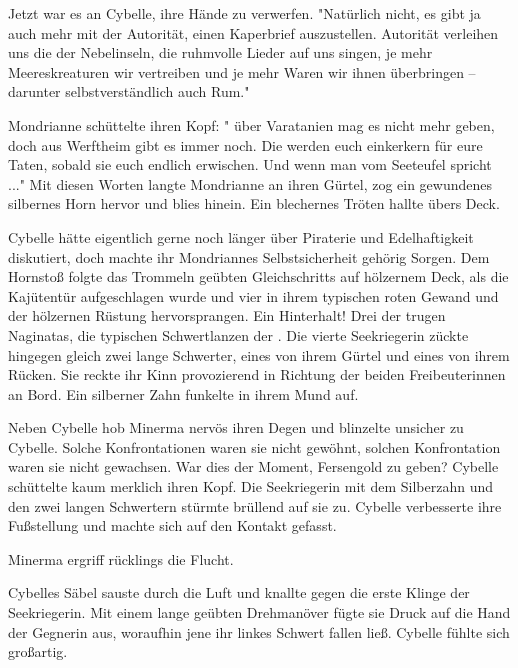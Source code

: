 Jetzt war es an Cybelle, ihre Hände zu verwerfen. "Natürlich nicht, es gibt ja auch  mehr mit der Autorität, einen Kaperbrief auszustellen. Autorität verleihen uns die  der Nebelinseln, die ruhmvolle Lieder auf uns singen, je mehr Meereskreaturen wir vertreiben und je mehr Waren wir ihnen überbringen – darunter selbstverständlich auch Rum."

Mondrianne schüttelte ihren Kopf: " über Varatanien mag es nicht mehr geben, doch  aus Werftheim gibt es immer noch. Die werden euch einkerkern für eure Taten, sobald sie euch endlich erwischen. Und wenn man vom Seeteufel spricht ..." Mit diesen Worten langte Mondrianne an ihren Gürtel, zog ein gewundenes silbernes Horn hervor und blies hinein. Ein blechernes Tröten hallte übers Deck.

Cybelle hätte eigentlich gerne noch länger über Piraterie und Edelhaftigkeit diskutiert, doch machte ihr Mondriannes Selbstsicherheit gehörig Sorgen. Dem Hornstoß folgte das Trommeln geübten Gleichschritts auf hölzernem Deck, als die Kajütentür aufgeschlagen wurde und vier  in ihrem typischen roten Gewand und der hölzernen Rüstung hervorsprangen. Ein Hinterhalt! Drei der  trugen Naginatas, die typischen Schwertlanzen der . Die vierte Seekriegerin zückte hingegen gleich zwei lange Schwerter, eines von ihrem Gürtel und eines von ihrem Rücken. Sie reckte ihr Kinn provozierend in Richtung der beiden Freibeuterinnen an Bord. Ein silberner Zahn funkelte in ihrem Mund auf.

Neben Cybelle hob Minerma nervös ihren Degen und blinzelte unsicher zu Cybelle. Solche Konfrontationen waren sie nicht gewöhnt, solchen Konfrontation waren sie nicht gewachsen. War dies der Moment, Fersengold zu geben? Cybelle schüttelte kaum merklich ihren Kopf. Die Seekriegerin mit dem Silberzahn und den zwei langen Schwertern stürmte brüllend auf sie zu. Cybelle verbesserte ihre Fußstellung und machte sich auf den Kontakt gefasst.

Minerma ergriff rücklings die Flucht. 

Cybelles Säbel sauste durch die Luft und knallte gegen die erste Klinge der Seekriegerin. Mit einem lange geübten Drehmanöver fügte sie Druck auf die Hand der Gegnerin aus, woraufhin jene ihr linkes Schwert fallen ließ. Cybelle fühlte sich großartig.

